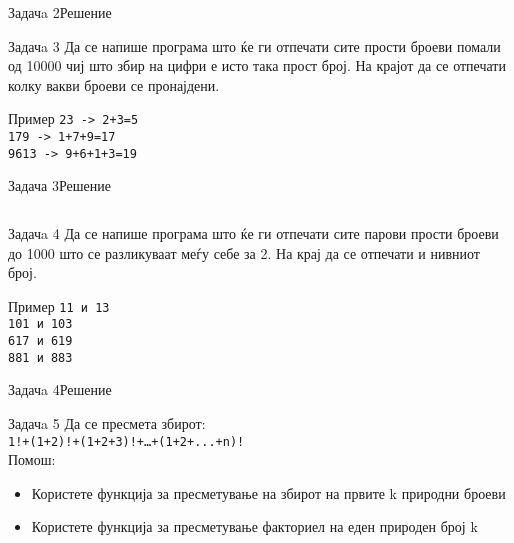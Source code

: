 \begin{frame}[fragile]{Задачa 2}{Решение} 

\end{frame}

\begin{frame}{Задачa 3}
Да се напише програма што ќе ги отпечати сите прости броеви помали од 10000 чиј
што збир на цифри е исто така прост број. На крајот да се отпечати колку вакви
броеви се пронајдени.
\begin{exampleblock}{Пример}
\texttt{23 -> 2+3=5}\\
\texttt{179 -> 1+7+9=17}\\
\texttt{9613 -> 9+6+1+3=19}
\end{exampleblock}
\end{frame}

\begin{frame}[fragile]{Задача 3}{Решение} 
\begin{columns}
    
    
\end{columns}
\end{frame}

\begin{frame}{Задачa 4}
Да се напише програма што ќе ги отпечати сите парови прости броеви до 1000 што
се разликуваат меѓу себе за 2. На крај да се отпечати и нивниот број.
\begin{exampleblock}{Пример}
\texttt{11 и 13}\\
\texttt{101 и 103}\\
\texttt{617 и 619}\\
\texttt{881 и 883}
\end{exampleblock}
\end{frame}

\begin{frame}[fragile]{Задачa 4}{Решение}
   
\end{frame}

\begin{frame}{Задачa 5}
Да се пресмета збирот:\\
\texttt{1!+(1+2)!+(1+2+3)!+\ldots+(1+2+...+n)!}
\\Помош:\\
\begin{itemize}
    \item Користете функција за пресметување на збирот на првите k природни
  броеви
    \item Користете функција за пресметување факториел на еден природен број k
\end{itemize}
\end{frame}

